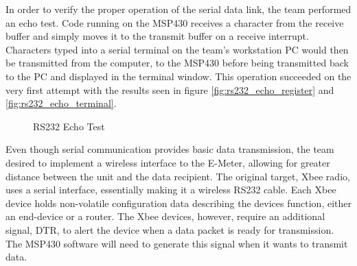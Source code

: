 In order to verify the proper operation of the serial data link, the team performed an echo test. Code running on the MSP430 receives a character from the receive buffer and simply moves it to the transmit buffer on a receive interrupt. Characters typed into a serial terminal on the team's workstation \ac{PC} would then be transmitted from the computer, to the MSP430 before being transmitted back to the PC and displayed in the terminal window. This operation succeeded on the very first attempt with the results seen in figure \ref{fig:rs232_echo_register} and \ref{fig:rs232_echo_terminal}.
\begin{figure}[htbp]
\begin{center}
\quad
{}
\caption{RS232 Echo Test}
\label{fig:rs232_echo_test}
\end{center}
\end{figure}
Even though serial communication provides basic data transmission, the team desired to implement a wireless interface to the E-Meter, allowing for greater distance between the unit and the data recipient. The original target, Xbee radio, uses a serial interface, essentially making it a wireless \ac{RS232} cable. Each Xbee device holds non-volatile configuration data describing the devices function, either an end-device or a router. The Xbee devices, however, require an additional signal, \ac{DTR}, to alert the device when a data packet is ready for transmission. The MSP430 software will need to generate this signal when it wants to transmit data.

